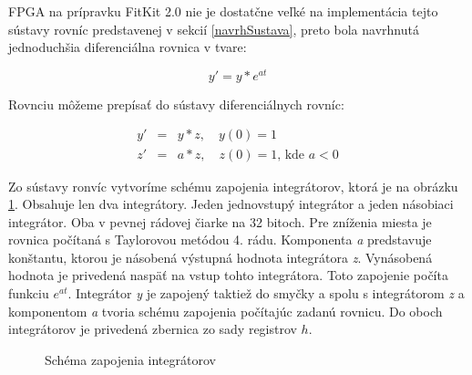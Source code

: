 

FPGA na prípravku FitKit 2.0 nie je dostatčne veľké na implementácia tejto  sústavy rovníc predstavenej v sekcií \ref{navrhSustava}, preto bola navrhnutá jednoduchšia diferenciálna rovnica v tvare:

\begin{equation}
y' = y * e^{at} \label{rovnica}
\end{equation}

Rovnciu môžeme prepísať do sústavy diferenciálnych rovníc:

\begin{eqnarray}
y' & = & y * z , \quad y(0) = 1 \label{rovnicasustava} \\
z' & = & a * z , \quad z(0) = 1 \text{, kde } a < 0
\end{eqnarray}

Zo sústavy ronvíc vytvoríme schému zapojenia integrátorov, ktorá je na obrázku \ref{ppi_fp_sustava_impl}. Obsahuje len dva integrátory. Jeden jednovstupý integrátor a jeden násobiaci integrátor. Oba v pevnej rádovej čiarke na 32 bitoch. Pre zníženia miesta je rovnica počítaná s Taylorovou metódou 4. rádu. Komponenta \textit{a} predstavuje konštantu, ktorou je násobená výstupná hodnota integrátora \textit{z}. Vynásobená hodnota je privedená naspäť na vstup tohto integrátora. Toto zapojenie počíta funkciu $ e^{at} $. Integrátor \textit{y} je zapojený taktiež do smyčky a spolu s integrátorom \textit{z} a komponentom \textit{a} tvoria schému zapojenia počítajúc zadanú rovnicu. Do oboch integrátorov je privedená zbernica zo sady registrov $ h $.

\bigskip
\begin{figure}[h]
\centering
{}
\caption{Schéma zapojenia integrátorov}
\label{ppi_fp_sustava_impl}
\end{figure}


